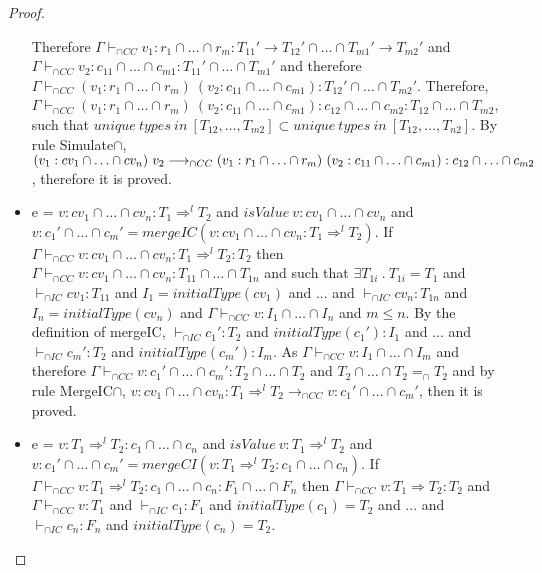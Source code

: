 \documentclass[a4paper]{article}
\begin{document}
\begin{proof}
\begin{itemize}
    Therefore $\Gamma \vdash_{\cap CC} v_1 : r_1 \cap \ldots \cap r_m : T_{11}' \rightarrow T_{12}' \cap \ldots \cap T_{m1}' \rightarrow T_{m2}'$ and $\Gamma \vdash_{\cap CC} v_2 : c_{11} \cap \ldots \cap c_{m1} : T_{11}' \cap \ldots \cap T_{m1}'$ and therefore $\Gamma \vdash_{\cap CC} (v_1 : r_1 \cap \ldots \cap r_m)\ (v_2 : c_{11} \cap \ldots \cap c_{m1}) : T_{12}' \cap \ldots \cap T_{m2}'$.
    Therefore, $\Gamma \vdash_{\cap CC} (v_1 : r_1 \cap \ldots \cap r_m)\ (v_2 : c_{11} \cap \ldots \cap c_{m1}) : c_{12} \cap \ldots \cap c_{m2} : T_{12} \cap \ldots \cap T_{m2}$, such that $unique\ types\ in\ [T_{12}, \ldots, T_{m2}] \subset unique\ types\ in\ [T_{12}, \ldots, T_{n2}]$.
    By rule Simulate$\cap$, $(v_1 : cv_1 \cap \ldots \cap cv_n)\ v_2 \longrightarrow_{\cap CC}\\ (v_1 : r_1 \cap \ldots \cap r_m)\ (v_2 : c_{11} \cap \ldots \cap c_{m1}) : c_{12} \cap \ldots \cap c_{m2}$, therefore it is proved.
    \item e = $v : cv_1 \cap \ldots \cap cv_n : T_1 \Rightarrow^l T_2$ and $isValue\ v : cv_1 \cap \ldots \cap cv_n$ and $v : c_1' \cap \ldots \cap c_m' = mergeIC(v : cv_1 \cap \ldots \cap cv_n : T_1 \Rightarrow^l T_2)$.
    If $\Gamma \vdash_{\cap CC} v : cv_1 \cap \ldots \cap cv_n : T_1 \Rightarrow^l T_2 : T_2$ then $\Gamma \vdash_{\cap CC} v : cv_1 \cap \ldots \cap cv_n : T_{11} \cap \ldots \cap T_{1n}$ and such that $\exists T_{1i}\ .\ T_{1i} = T_1$ and $\vdash_{\cap IC} cv_1 : T_{11}$ and $I_1 = initialType(cv_1)$ and ... and $\vdash_{\cap IC} cv_n : T_{1n}$ and $I_n = initialType(cv_n)$ and $\Gamma \vdash_{\cap CC} v : I_1 \cap \ldots \cap I_n$ and $m \leq n$.
    By the definition of mergeIC, $\vdash_{\cap IC} c_1' : T_2$ and $initialType(c_1') : I_1$ and ... and $\vdash_{\cap IC} c_m' : T_2$ and $initialType(c_m') : I_m$.
    As $\Gamma \vdash_{\cap CC} v : I_1 \cap \ldots \cap I_m$ and therefore $\Gamma \vdash_{\cap CC} v : c_1' \cap \ldots \cap c_m' : T_2 \cap \ldots \cap T_2$ and $T_2 \cap \ldots \cap T_2 =_{\cap} T_2$ and by rule MergeIC$\cap$, $v : cv_1 \cap \ldots \cap cv_n : T_1 \Rightarrow^l T_2 \longrightarrow_{\cap CC} v : c_1' \cap \ldots \cap c_m'$, then it is proved.
    \item e = $v : T_1 \Rightarrow^l T_2 : c_1 \cap \ldots \cap c_n$ and $isValue\ v : T_1 \Rightarrow^l T_2$ and $v : c_1' \cap \ldots \cap c_m' = mergeCI(v : T_1 \Rightarrow^l T_2 : c_1 \cap \ldots \cap c_n)$.
    If $\Gamma \vdash_{\cap CC} v : T_1 \Rightarrow^l T_2 : c_1 \cap \ldots \cap c_n : F_1 \cap \ldots \cap F_n$ then $\Gamma \vdash_{\cap CC} v : T_1 \Rightarrow T_2 : T_2$ and $\Gamma \vdash_{\cap CC} v : T_1$ and $\vdash_{\cap IC} c_1 : F_1$ and $initialType(c_1) = T_2$ and ... and $\vdash_{\cap IC} c_n : F_n$ and $initialType(c_n) = T_2$.

\end{itemize}
\end{proof}
\end{document}
